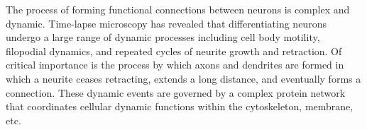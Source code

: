 
The  process  of forming  functional  connections  between neurons  is
complex  and   dynamic.   Time-lapse  microscopy   has  revealed  that
differentiating  neurons undergo  a large  range of  dynamic processes
including cell body motility, filopodial dynamics, and repeated cycles
of  neurite growth  and  retraction.  Of  critical  importance is  the
process  by which  axons and  dendrites are  formed in  which a neurite
ceases retracting, extends a   long  distance, and eventually  forms
a connection. These  dynamic events are  governed by a  complex protein
network that  coordinates  cellular  dynamic functions 
within the cytoskeleton, membrane, etc.



